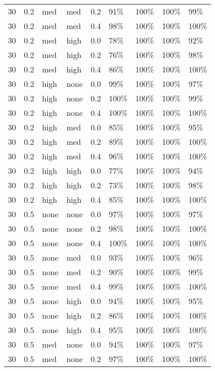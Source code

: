 \begin{longtable}{rrllrllll}
  30 & 0.2 & med & med & 0.2 & 91\% & 100\% & 100\% & 99\% \\ 
  30 & 0.2 & med & med & 0.4 & 98\% & 100\% & 100\% & 100\% \\ 
  30 & 0.2 & med & high & 0.0 & 78\% & 100\% & 100\% & 92\% \\ 
  30 & 0.2 & med & high & 0.2 & 76\% & 100\% & 100\% & 98\% \\ 
  30 & 0.2 & med & high & 0.4 & 86\% & 100\% & 100\% & 100\% \\ 
  30 & 0.2 & high & none & 0.0 & 99\% & 100\% & 100\% & 97\% \\ 
  30 & 0.2 & high & none & 0.2 & 100\% & 100\% & 100\% & 99\% \\ 
  30 & 0.2 & high & none & 0.4 & 100\% & 100\% & 100\% & 100\% \\ 
  30 & 0.2 & high & med & 0.0 & 85\% & 100\% & 100\% & 95\% \\ 
  30 & 0.2 & high & med & 0.2 & 89\% & 100\% & 100\% & 100\% \\ 
  30 & 0.2 & high & med & 0.4 & 96\% & 100\% & 100\% & 100\% \\ 
  30 & 0.2 & high & high & 0.0 & 77\% & 100\% & 100\% & 94\% \\ 
  30 & 0.2 & high & high & 0.2 & 73\% & 100\% & 100\% & 98\% \\ 
  30 & 0.2 & high & high & 0.4 & 85\% & 100\% & 100\% & 100\% \\ 
  30 & 0.5 & none & none & 0.0 & 97\% & 100\% & 100\% & 97\% \\ 
  30 & 0.5 & none & none & 0.2 & 98\% & 100\% & 100\% & 100\% \\ 
  30 & 0.5 & none & none & 0.4 & 100\% & 100\% & 100\% & 100\% \\ 
  30 & 0.5 & none & med & 0.0 & 93\% & 100\% & 100\% & 96\% \\ 
  30 & 0.5 & none & med & 0.2 & 90\% & 100\% & 100\% & 99\% \\ 
  30 & 0.5 & none & med & 0.4 & 99\% & 100\% & 100\% & 100\% \\ 
  30 & 0.5 & none & high & 0.0 & 94\% & 100\% & 100\% & 95\% \\ 
  30 & 0.5 & none & high & 0.2 & 86\% & 100\% & 100\% & 100\% \\ 
  30 & 0.5 & none & high & 0.4 & 95\% & 100\% & 100\% & 100\% \\ 
  30 & 0.5 & med & none & 0.0 & 94\% & 100\% & 100\% & 97\% \\ 
  30 & 0.5 & med & none & 0.2 & 97\% & 100\% & 100\% & 100\% \\ 

\end{longtable}

